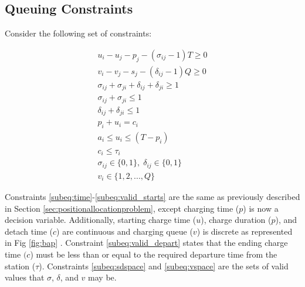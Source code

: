 \documentclass[letterpaper, 10pt, conference]{IEEEtran}
\begin{document}
\subsection{Queuing Constraints}
\noindent
Consider the following set of constraints:

\begin{subequations}
\label{eq:packconstrs}
\begin{align}
    u_i - u_j - p_j - (\sigma_{ij} - 1)T \geq 0                      \label{subeq:time}         \\
    v_i - v_j - s_j - (\delta_{ij} - 1)Q \geq 0                      \label{subeq:space}        \\
    \sigma_{ij} + \sigma_{ji} + \delta_{ij} + \delta_{ji} \geq 1     \label{subeq:valid_pos}    \\
    \sigma_{ij} + \sigma_{ji} \leq 1                                 \label{subeq:sigma}        \\
    \delta_{ij} + \delta_{ji} \leq 1                                 \label{subeq:delta}        \\
    p_i + u_i = c_i                                                  \label{subeq:detach}       \\
    a_i \leq u_i \leq (T - p_i)                                      \label{subeq:valid_starts} \\
    c_i \leq \tau_i                                                  \label{subeq:valid_depart} \\
    \sigma_{ij} \in \{0,1\},\;\delta_{ij} \in \{0,1\}                \label{subeq:sdspace}      \\
    v_i \in \{1,2, ... , Q\}                                         \label{subeq:vspace}
\end{align}
\end{subequations}

Constraints \eqref{subeq:time}-\eqref{subeq:valid_starts} are the same as previously described in Section \ref{sec:positionallocationproblem}, except charging time (\(p\)) is now a decision variable. Additionally, starting charge time (\(u\)), charge duration (\(p\)), and detach time (\(c\)) are continuous and charging queue (\(v\)) is discrete as represented in Fig \ref{fig:bap} . Constraint \eqref{subeq:valid_depart} states that the ending charge time \((c\)) must be less than or equal to the required departure time from the station (\(\tau\)). Constraints \eqref{subeq:sdspace} and \eqref{subeq:vspace} are the sets of valid values that \(\sigma\), \(\delta\), and \(v\) may be.
\end{document}
